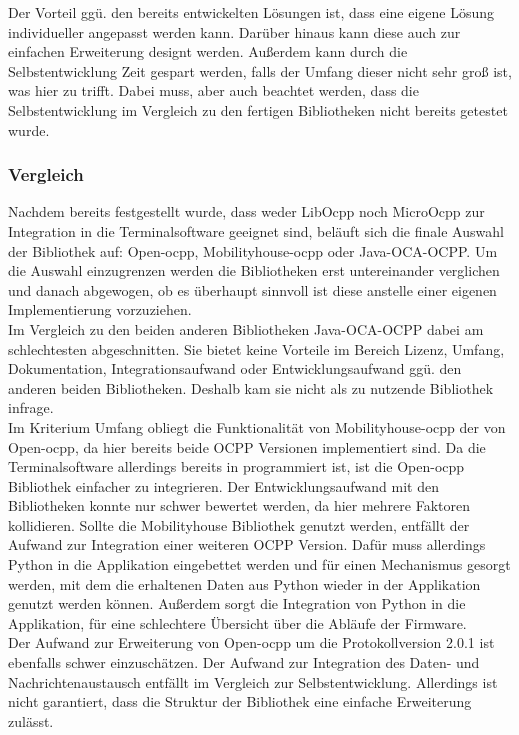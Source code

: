 \noindent Der Vorteil ggü. den bereits entwickelten Lösungen ist, dass eine eigene Lösung individueller angepasst werden kann. Darüber hinaus kann diese auch zur einfachen Erweiterung designt werden. Außerdem kann durch die Selbstentwicklung Zeit gespart werden, falls der Umfang dieser nicht sehr groß ist, was hier zu trifft. Dabei muss, aber auch beachtet werden, dass die Selbstentwicklung im Vergleich zu den fertigen Bibliotheken nicht bereits getestet wurde.
\subsubsection{Vergleich}
\noindent Nachdem bereits festgestellt wurde, dass weder LibOcpp noch MicroOcpp zur Integration in die Terminalsoftware geeignet sind, beläuft sich die finale Auswahl der Bibliothek auf: Open-ocpp, Mobilityhouse-ocpp oder Java-OCA-OCPP. Um die Auswahl einzugrenzen werden die Bibliotheken erst untereinander verglichen und danach abgewogen, ob es überhaupt sinnvoll ist diese anstelle einer eigenen Implementierung vorzuziehen. \\

\noindent Im Vergleich zu den beiden anderen Bibliotheken Java-OCA-OCPP dabei am schlechtesten abgeschnitten. Sie bietet keine Vorteile im Bereich Lizenz, Umfang, Dokumentation, Integrationsaufwand oder Entwicklungsaufwand ggü. den anderen beiden Bibliotheken. Deshalb kam sie nicht als zu nutzende Bibliothek infrage.\\

\noindent Im Kriterium Umfang obliegt die Funktionalität von Mobilityhouse-ocpp der von Open-ocpp, da hier bereits beide OCPP Versionen implementiert sind. Da die Terminalsoftware allerdings bereits in \cpp programmiert ist, ist die Open-ocpp Bibliothek einfacher zu integrieren. Der Entwicklungsaufwand mit den Bibliotheken konnte nur schwer bewertet werden, da hier mehrere Faktoren kollidieren. Sollte die Mobilityhouse Bibliothek genutzt werden, entfällt der Aufwand zur Integration einer weiteren OCPP Version. Dafür muss allerdings Python in die Applikation eingebettet werden und für einen Mechanismus gesorgt werden, mit dem die erhaltenen Daten aus Python wieder in der \cpp Applikation genutzt werden können. Außerdem sorgt die Integration von Python in die Applikation, für eine schlechtere Übersicht über die Abläufe der Firmware.\\

\noindent Der Aufwand zur Erweiterung von Open-ocpp um die Protokollversion 2.0.1 ist ebenfalls schwer einzuschätzen. Der Aufwand zur Integration des Daten- und Nachrichtenaustausch entfällt im Vergleich zur Selbstentwicklung. Allerdings ist nicht garantiert, dass die Struktur der Bibliothek eine einfache Erweiterung zulässt.\newline

